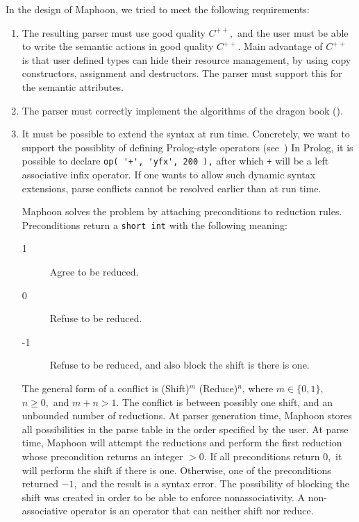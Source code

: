 \documentclass{article}
\begin{document}
\noindent
In the design of Maphoon, we tried to meet the following requirements:
\begin{enumerate}
\item
   The resulting parser must use good quality $ C^{++}, $ 
   and the user must be able to write the semantic actions 
   in good quality $ C^{++}. $ 
   Main advantage of $ C^{++} $ is that user defined types can hide
   their resource management,
   by using copy constructors, assignment and destructors.
   The parser must support this for the semantic attributes.

\item
   The parser must correctly implement the algorithms of the 
   dragon book (\cite{Dragon2007}).

\item
   It must be possible to extend the syntax at run time. Concretely,
   we want to support the possiblity of defining Prolog-style operators 
   (see~\cite{SterlingShapiro94})
   In Prolog, it is possible to declare \verb&op( '+', 'yfx', 200 ),& 
   after which \verb|+| will be a left associative infix operator.
   If one wants to allow such dynamic syntax extensions, parse 
   conflicts cannot be resolved earlier than at run time. 
   
   \noindent
   Maphoon solves the problem by attaching preconditions to 
   reduction rules. Preconditions return a \verb+short int+
   with the following meaning:
   \begin{description}   
   \item[1] Agree to be reduced. 
   \item[0] Refuse to be reduced. 
   \item[-1] Refuse to be reduced, and also block the shift
      is there is one.
   \end{description}
   The general form of a conflict
   is (Shift)$^m$ (Reduce)$^n$, where $ m \in \{ 0, 1 \}, $ 
   $ n \geq 0, $ and $ m+n > 1. $
   The conflict is between possibly one shift,
   and an unbounded number of reductions. At parser generation time,
   Maphoon stores all possibilities in the parse table
   in the order specified by the user. 
   At parse time, Maphoon will attempt the reductions
   and perform the first reduction whose precondition returns
   an integer $ > 0. $ 
   If all preconditions return $ 0, $ it will perform the shift
   if there is one. Otherwise, one of the preconditions returned $ -1, $
   and the result is a syntax error. 
   The possibility of blocking the shift was created 
   in order to be able to enforce nonassociativity. 
   A non-associative operator is an
   operator that can neither shift nor reduce. 
\end{enumerate} 
\end{document}
